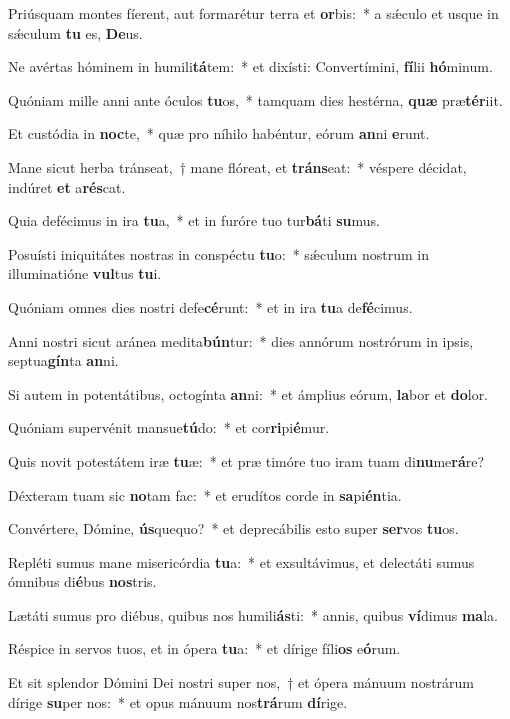 \item Priúsquam montes fíerent, aut formarétur terra et \textbf{or}bis:~* a sǽculo et usque in sǽculum \textbf{tu} es, \textbf{De}us.
\item Ne avértas hóminem in humili\textbf{tá}tem:~* et dixísti: Convertímini, \textbf{fí}lii \textbf{hó}minum.
\item Quóniam mille anni ante óculos \textbf{tu}os,~* tamquam dies hestérna, \textbf{quæ} præ\textbf{tér}iit.
\item Et custódia in \textbf{noc}te,~* quæ pro níhilo habéntur, eórum \textbf{an}ni \textbf{e}runt.
\item Mane sicut herba tránseat,~† mane flóreat, et \textbf{tráns}eat:~* véspere décidat, indúret \textbf{et} a\textbf{rés}cat.
\item Quia defécimus in ira \textbf{tu}a,~* et in furóre tuo tur\textbf{bá}ti \textbf{su}mus.
\item Posuísti iniquitátes nostras in conspéctu \textbf{tu}o:~* sǽculum nostrum in illuminatióne \textbf{vul}tus \textbf{tu}i.
\item Quóniam omnes dies nostri defe\textbf{cé}runt:~* et in ira \textbf{tu}a de\textbf{fé}cimus.
\item Anni nostri sicut aránea medita\textbf{bún}tur:~* dies annórum nostrórum in ipsis, septua\textbf{gín}ta \textbf{an}ni.
\item Si autem in potentátibus, octogínta \textbf{an}ni:~* et ámplius eórum, \textbf{la}bor et \textbf{do}lor.
\item Quóniam supervénit mansue\textbf{tú}do:~* et cor\textbf{ri}pi\textbf{é}mur.
\item Quis novit potestátem iræ \textbf{tu}æ:~* et præ timóre tuo iram tuam di\textbf{nu}me\textbf{rá}re?
\item Déxteram tuam sic \textbf{no}tam fac:~* et erudítos corde in \textbf{sa}pi\textbf{én}tia.
\item Convértere, Dómine, \textbf{ús}quequo?~* et deprecábilis esto super \textbf{ser}vos \textbf{tu}os.
\item Repléti sumus mane misericórdia \textbf{tu}a:~* et exsultávimus, et delectáti sumus ómnibus di\textbf{é}bus \textbf{nos}tris.
\item Lætáti sumus pro diébus, quibus nos humili\textbf{ás}ti:~* annis, quibus \textbf{ví}dimus \textbf{ma}la.
\item Réspice in servos tuos, et in ópera \textbf{tu}a:~* et dírige fíli\textbf{os} e\textbf{ó}rum.
\item Et sit splendor Dómini Dei nostri super nos,~† et ópera mánuum nostrárum dírige \textbf{su}per nos:~* et opus mánuum nos\textbf{trá}rum \textbf{dí}rige.
